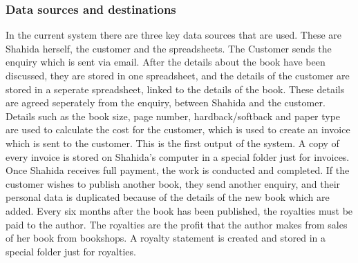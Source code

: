 \subsubsection{Data sources and destinations}
In the current system there are three key data sources that are used. These are Shahida herself, the customer and the spreadsheets. The Customer sends the enquiry which is sent via email. After the details about the book have been discussed, they are stored in one spreadsheet, and the details of the customer are stored in a seperate spreadsheet, linked to the details of the book. These details are agreed seperately from the enquiry, between Shahida and the customer. Details such as the book size, page number, hardback/softback and paper type are used to calculate the cost for the customer, which is used to create an invoice which is sent to the customer. This is the first output of the system. A copy of every invoice is stored on Shahida's computer in a special folder just for invoices. Once Shahida receives full payment, the work is conducted and completed. If the customer wishes to publish another book, they send another enquiry, and their personal data is duplicated because of the details of the new book which are added. Every six months after the book has been published, the royalties must be paid to the author. The royalties are the profit that the author makes from sales of her book from bookshops. A royalty statement is created and stored in a special folder just for royalties.

